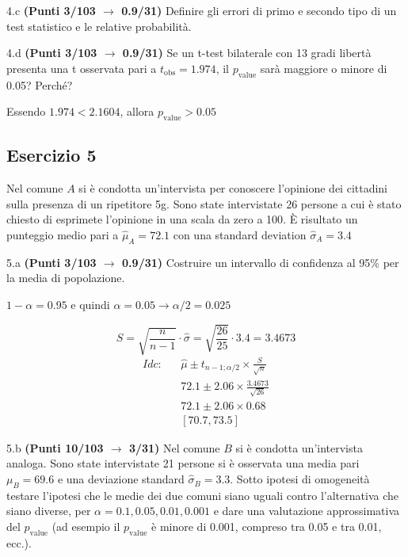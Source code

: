 \documentclass[
  11pt,
]{book}
\theoremstyle{mytheoremstyle}
\theoremstyle{mydefstyle}
\newenvironment{sol}
  {
  \begin{tcolorbox}[enhanced,breakable,arc=0.1mm,boxrule=1pt,colback=white,colframe=iblue,
  title=\bf \fontfamily{lmss}\selectfont \hspace{.5 cm} Soluzione,drop fuzzy shadow]

}{
\end{tcolorbox}
  }
\begin{document}
4.c \textbf{(Punti 3/103 \(\rightarrow\) 0.9/31)} Definire gli errori di primo e secondo tipo di un test statistico e le relative probabilità.

4.d \textbf{(Punti 3/103 \(\rightarrow\) 0.9/31)} Se un t-test bilaterale con 13 gradi libertà presenta una
t osservata pari a \(t_\text{obs}=1.974\), il \(p_\text{value}\) sarà maggiore o minore di 0.05? Perché?

\begin{sol}
Essendo \(1.974< 2.1604\), allora
\(p_\text{value}>0.05\)

\end{sol}

\subsection{Esercizio 5}\label{esercizio-5-44}

Nel comune \(A\) si è condotta un'intervista per conoscere l'opinione
dei cittadini sulla presenza di un ripetitore 5g. Sono state intervistate
26 persone a cui è stato chiesto di esprimete l'opinione in una scala da zero a 100.
È risultato un punteggio medio pari a \(\hat\mu_A=72.1\) con una standard deviation
\(\hat\sigma_A=3.4\)

5.a \textbf{(Punti 3/103 \(\rightarrow\) 0.9/31)} Costruire un intervallo di confidenza al 95\%
per la media di popolazione.

\begin{sol}
\(1-\alpha =0.95\) e quindi \(\alpha=0.05\rightarrow \alpha/2=0.025\)

\[
      S  =\sqrt{\frac {n}{n-1}}\cdot\hat\sigma =
     \sqrt{\frac { 26 }{ 25 }}\cdot 3.4 = 3.4673 
\]
\begin{eqnarray*}
  Idc: & &  \hat\mu \pm  t_{n-1;\alpha/2} \times \frac{S}{\sqrt{n}} \\
     & &  72.1 \pm  2.06 \times \frac{ 3.4673 }{\sqrt{ 26 }} \\
     & &  72.1 \pm  2.06 \times  0.68 \\
     & & [ 70.7 ,  73.5 ]
\end{eqnarray*}

\end{sol}

5.b \textbf{(Punti 10/103 \(\rightarrow\) 3/31)} Nel comune \(B\) si è condotta un'intervista analoga.
Sono state intervistate 21 persone si è osservata una media pari \(\mu_B=69.6\) e una deviazione standard \(\hat\sigma_B=3.3\).
Sotto ipotesi di omogeneità testare l'ipotesi che le medie dei due comuni siano uguali contro l'alternativa che siano diverse, per \(\alpha=0.1,0.05,0.01,0.001\) e dare una valutazione approssimativa del \(p_\text{value}\) (ad esempio il \(p_\text{value}\) è minore di 0.001, compreso tra 0.05 e tra 0.01, ecc.).
\end{document}
